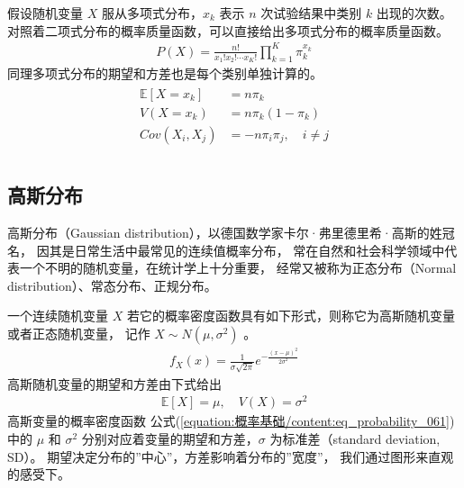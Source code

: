 \documentclass[letterpaper,10pt,english]{sphinxmanual}
\begin{document}
假设随机变量 \(X\) 服从多项式分布，\(x_k\) 表示 \(n\) 次试验结果中类别 \(k\)
出现的次数。对照着二项式分布的概率质量函数，可以直接给出多项式分布的概率质量函数。
\begin{equation}\label{equation:概率基础/content:概率基础/content:65}
\begin{split}P(X) = \frac{n!}{x_1! x_2! \cdots x_K! } \prod_{k=1}^K \pi_k^{x_k}\end{split}
\end{equation}
同理多项式分布的期望和方差也是每个类别单独计算的。
\begin{align}\label{equation:概率基础/content:概率基础/content:66}\!\begin{aligned}
\mathbb{E}[X=x_k] &= n \pi_k\\
V(X=x_k) &= n \pi_k(1-\pi_k)\\
Cov(X_i,X_j) &= -n \pi_i \pi_j, \quad i \neq j\\
\end{aligned}\end{align}

\subsection{高斯分布}
\label{\detokenize{_u6982_u7387_u57fa_u7840/content:id22}}
高斯分布（Gaussian distribution），以德国数学家卡尔·弗里德里希·高斯的姓冠名，
因其是日常生活中最常见的连续值概率分布，
常在自然和社会科学领域中代表一个不明的随机变量，在统计学上十分重要，
经常又被称为正态分布（Normal distribution）、常态分布、正规分布。

一个连续随机变量 \(X\) 若它的概率密度函数具有如下形式，则称它为高斯随机变量或者正态随机变量，
记作 \(X \sim N(\mu,\sigma^2)\) 。
\begin{equation}\label{equation:概率基础/content:eq_probability_061}
\begin{split}f_X(x) = \frac{1}{\sigma\sqrt{2\pi }} e^{-\frac{(x-\mu)^2}{2 \sigma^2}}\end{split}
\end{equation}
高斯随机变量的期望和方差由下式给出
\begin{equation}\label{equation:概率基础/content:概率基础/content:67}
\begin{split}\mathbb{E} [X] = \mu,\quad V(X)=\sigma^2\end{split}
\end{equation}
高斯变量的概率密度函数 公式(\ref{equation:概率基础/content:eq_probability_061}) 中的 \(\mu\) 和 \(\sigma^2\)
分别对应着变量的期望和方差，\(\sigma\) 为标准差（standard deviation, SD）。
期望决定分布的”中心”，方差影响着分布的”宽度”，
我们通过图形来直观的感受下。
\end{document}
